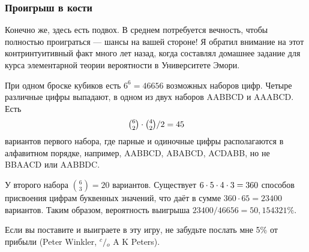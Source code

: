 \subsubsection*{Проигрыш в кости}%

Конечно же, здесь есть подвох.
В среднем потребуется вечность, чтобы полностью проиграться --- шансы на вашей стороне! 
Я обратил внимание на этот контринтуитивный факт много лет назад, когда составлял домашнее задание для курса элементарной теории вероятности в Университете Эмори.

При одном броске кубиков есть $6^6 =46656$ возможных наборов цифр.
Четыре различные цифры выпадают, в одном из двух наборов AABBCD и AAABCD.
Есть
\[\tbinom62\cdot\tbinom42/2=45\]
вариантов первого набора, где парные и одиночные цифры располагаются в алфавитном порядке, например, AABBCD, ABABCD, ACDABB, но не BBAACD или AABBDC.

У второго набора $\binom63=20$  вариантов.
Существует $6\cdot 5\cdot 4\cdot 3\z=360$ способов присвоения цифрам буквенных значений, что даёт в сумме $360\cdot 65=23400$ вариантов.
Таким образом, вероятность выигрыша
$23400/46656 = 50{,}154321\%$.
\heart

Если вы поставите и выиграете в эту игру, не забудьте послать мне 5\% от прибыли 
(Peter Winkler, ${^c\!/\!_o}$ A  K Peters).
